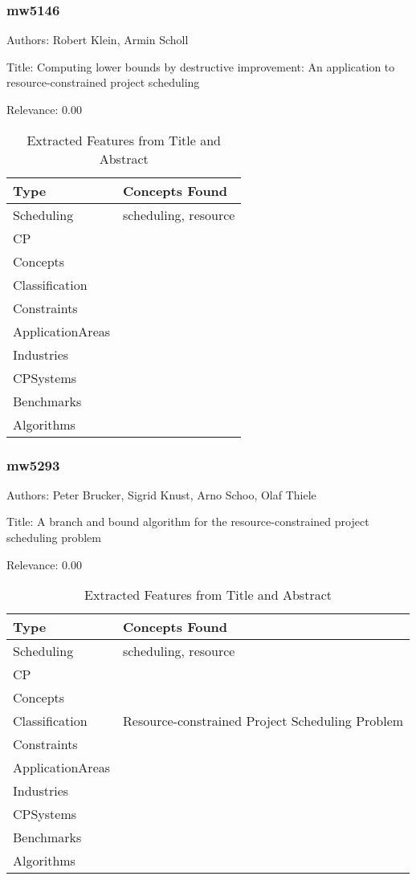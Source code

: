 \subsubsection{mw5146}
\label{mw:mw5146}

Authors: Robert Klein, Armin Scholl

Title: Computing lower bounds by destructive improvement: An application to resource-constrained project scheduling

Relevance:  0.00

{\scriptsize
\begin{longtable}{p{2cm}p{20cm}}
\caption{Extracted Features from Title and Abstract}\\ \toprule
Type & Concepts Found\\ \midrule
\endhead
\bottomrule
\endfoot
Scheduling & scheduling, resource\\ 
CP & \\ 
Concepts & \\ 
Classification & \\ 
Constraints & \\ 
ApplicationAreas & \\ 
Industries & \\ 
CPSystems & \\ 
Benchmarks & \\ 
Algorithms & \\ 
\end{longtable}
}



\subsubsection{mw5293}
\label{mw:mw5293}

Authors: Peter Brucker, Sigrid Knust, Arno Schoo, Olaf Thiele

Title: A branch and bound algorithm for the resource-constrained project scheduling problem

Relevance:  0.00

{\scriptsize
\begin{longtable}{p{2cm}p{20cm}}
\caption{Extracted Features from Title and Abstract}\\ \toprule
Type & Concepts Found\\ \midrule
\endhead
\bottomrule
\endfoot
Scheduling & scheduling, resource\\ 
CP & \\ 
Concepts & \\ 
Classification & Resource-constrained Project Scheduling Problem\\ 
Constraints & \\ 
ApplicationAreas & \\ 
Industries & \\ 
CPSystems & \\ 
Benchmarks & \\ 
Algorithms & \\ 
\end{longtable}
}



